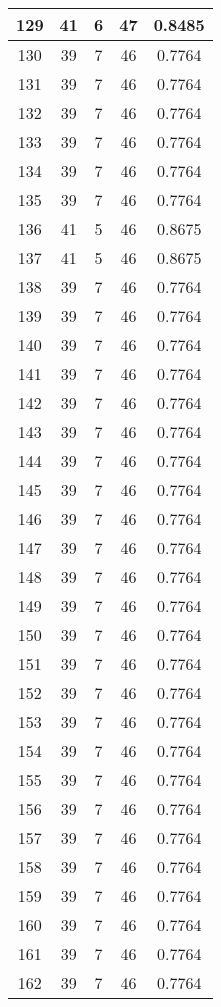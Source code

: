 \documentclass[letterpaper, 12pt]{article}
\begin{document}
\begin{longtable}{|c|c|c|c|c|}
\hline
129 & 41 & 6 & 47 & 0.8485 \\
\hline
130 & 39 & 7 & 46 & 0.7764 \\
\hline
131 & 39 & 7 & 46 & 0.7764 \\
\hline
132 & 39 & 7 & 46 & 0.7764 \\
\hline
133 & 39 & 7 & 46 & 0.7764 \\
\hline
134 & 39 & 7 & 46 & 0.7764 \\
\hline
135 & 39 & 7 & 46 & 0.7764 \\
\hline
136 & 41 & 5 & 46 & 0.8675 \\
\hline
137 & 41 & 5 & 46 & 0.8675 \\
\hline
138 & 39 & 7 & 46 & 0.7764 \\
\hline
139 & 39 & 7 & 46 & 0.7764 \\
\hline
140 & 39 & 7 & 46 & 0.7764 \\
\hline
141 & 39 & 7 & 46 & 0.7764 \\
\hline
142 & 39 & 7 & 46 & 0.7764 \\
\hline
143 & 39 & 7 & 46 & 0.7764 \\
\hline
144 & 39 & 7 & 46 & 0.7764 \\
\hline
145 & 39 & 7 & 46 & 0.7764 \\
\hline
146 & 39 & 7 & 46 & 0.7764 \\
\hline
147 & 39 & 7 & 46 & 0.7764 \\
\hline
148 & 39 & 7 & 46 & 0.7764 \\
\hline
149 & 39 & 7 & 46 & 0.7764 \\
\hline
150 & 39 & 7 & 46 & 0.7764 \\
\hline
151 & 39 & 7 & 46 & 0.7764 \\
\hline
152 & 39 & 7 & 46 & 0.7764 \\
\hline
153 & 39 & 7 & 46 & 0.7764 \\
\hline
154 & 39 & 7 & 46 & 0.7764 \\
\hline
155 & 39 & 7 & 46 & 0.7764 \\
\hline
156 & 39 & 7 & 46 & 0.7764 \\
\hline
157 & 39 & 7 & 46 & 0.7764 \\
\hline
158 & 39 & 7 & 46 & 0.7764 \\
\hline
159 & 39 & 7 & 46 & 0.7764 \\
\hline
160 & 39 & 7 & 46 & 0.7764 \\
\hline
161 & 39 & 7 & 46 & 0.7764 \\
\hline
162 & 39 & 7 & 46 & 0.7764 \\

\end{longtable}
\end{document}
